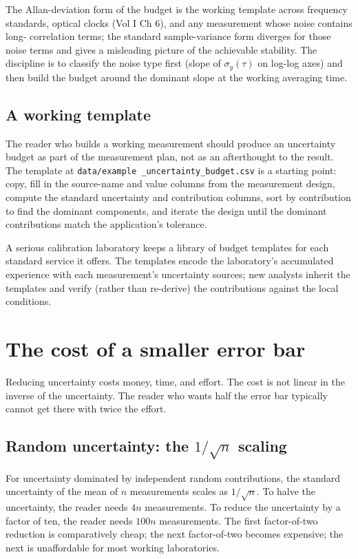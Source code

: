 The Allan-deviation form of the budget is the working
template across frequency standards, optical clocks (Vol I
Ch 6), and any measurement whose noise contains long-
correlation terms; the standard sample-variance form
diverges for those noise terms and gives a misleading
picture of the achievable stability. The discipline is to
classify the noise type first (slope of $\sigma_{y}(\tau)$
on log-log axes) and then build the budget around the
dominant slope at the working averaging time.

\subsection{A working template}

The reader who builds a working measurement should produce an
uncertainty budget as part of the measurement plan, not as an
afterthought to the result. The template at \texttt{data/example
\_uncertainty\_budget.csv} is a starting point: copy, fill in
the source-name and value columns from the measurement design,
compute the standard uncertainty and contribution columns, sort
by contribution to find the dominant components, and iterate the
design until the dominant contributions match the application's
tolerance.

A serious calibration laboratory keeps a library of budget
templates for each standard service it offers. The templates
encode the laboratory's accumulated experience with each
measurement's uncertainty sources; new analysts inherit the
templates and verify (rather than re-derive) the contributions
against the local conditions.

\section{The cost of a smaller error bar}

Reducing uncertainty costs money, time, and effort. The cost is not
linear in the inverse of the uncertainty. The reader who wants
half the error bar typically cannot get there with twice the effort.

\subsection{Random uncertainty: the $1/\sqrt{n}$ scaling}

For uncertainty dominated by independent random contributions, the
standard uncertainty of the mean of $n$ measurements scales as
$1/\sqrt{n}$. To halve the uncertainty, the reader needs $4n$
measurements. To reduce the uncertainty by a factor of ten, the
reader needs $100 n$ measurements. The first factor-of-two
reduction is comparatively cheap; the next factor-of-two becomes
expensive; the next is unaffordable for most working laboratories.

